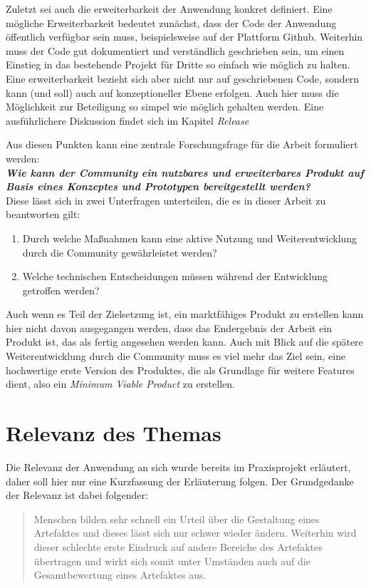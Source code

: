 Zuletzt sei auch die erweiterbarkeit der Anwendung konkret definiert. Eine mögliche Erweiterbarkeit bedeutet zunächst, dass der Code der Anwendung öffentlich verfügbar sein muss, beispielsweise auf der Plattform Github\footnotemark{}. Weiterhin muss der Code gut dokumentiert und verständlich geschrieben sein, um einen Einstieg in das bestehende Projekt für Dritte so einfach wie möglich zu halten. Eine erweiterbarkeit bezieht sich aber nicht nur auf geschriebenen Code, sondern kann (und soll) auch auf konzeptioneller Ebene erfolgen. Auch hier muss die Möglichkeit zur Beteiligung so simpel wie möglich gehalten werden. Eine ausführlichere Diskussion findet sich im Kapitel \textit{Release}\\


Aus diesen Punkten kann eine zentrale Forschungsfrage für die Arbeit formuliert werden:\\
\textit{\textbf{Wie kann der Community ein nutzbares und erweiterbares Produkt auf Basis eines Konzeptes und Prototypen bereitgestellt werden?}}\\
Diese lässt sich in zwei Unterfragen unterteilen, die es in dieser Arbeit zu beantworten gilt:
\begin{enumerate}
  \item Durch welche Maßnahmen kann eine aktive Nutzung und Weiterentwicklung durch die Community gewährleistet werden?
  \item Welche technischen Entscheidungen müssen während der Entwicklung getroffen werden?
\end{enumerate}

Auch wenn es Teil der Zielsetzung ist, ein marktfähiges Produkt zu erstellen kann hier nicht davon ausgegangen werden, dass das Endergebnis der Arbeit ein Produkt ist, das als fertig angesehen werden kann. Auch mit Blick auf die spätere Weiterentwicklung durch die Community muss es viel mehr das Ziel sein, eine hochwertige erste Version des Produktes, die als Grundlage für weitere Features dient, also ein \textit{Minimum Viable Product} zu erstellen.


\section{Relevanz des Themas}
\label{sec:relevance}
Die Relevanz der Anwendung an sich wurde bereits im Praxisprojekt erläutert, daher soll hier nur eine Kurzfassung der Erläuterung folgen. Der Grundgedanke der Relevanz ist dabei folgender:
\begin{quote}
  Menschen bilden sehr schnell ein Urteil über die Gestaltung eines Artefaktes und dieses lässt sich nur schwer wieder ändern. Weiterhin wird dieser schlechte erste Eindruck auf andere Bereiche des Artefaktes übertragen und wirkt sich somit unter Umständen auch auf die Gesamtbewertung eines Artefaktes aus.
\end{quote}

